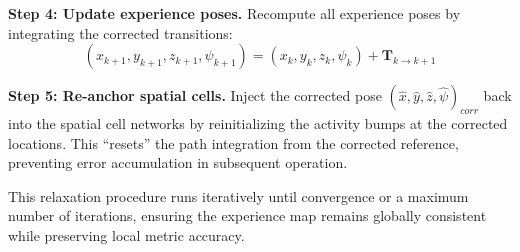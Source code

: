 \textbf{Step 4: Update experience poses.} Recompute all experience poses by integrating the corrected transitions:
\begin{equation}
    (x_{k+1}, y_{k+1}, z_{k+1}, \psi_{k+1}) = (x_k, y_k, z_k, \psi_k) + \mathbf{T}_{k \to k+1}
\end{equation}

\textbf{Step 5: Re-anchor spatial cells.} Inject the corrected pose $(\hat{x}, \hat{y}, \hat{z}, \hat{\psi})_{corr}$ back into the spatial cell networks by reinitializing the activity bumps at the corrected locations. This ``resets'' the path integration from the corrected reference, preventing error accumulation in subsequent operation.

This relaxation procedure runs iteratively until convergence or a maximum number of iterations, ensuring the experience map remains globally consistent while preserving local metric accuracy.

